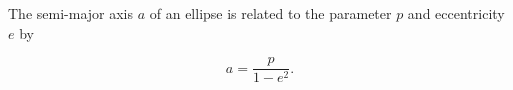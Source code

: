 The semi-major axis $a$ of an ellipse is related to the parameter $p$ and eccentricity $e$ by

$$a = \frac{p}{1 - e^2}.$$
